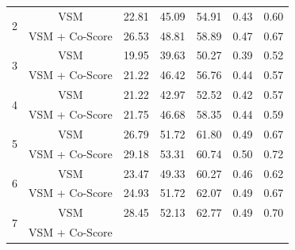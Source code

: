 \documentclass{sig-alternate}
\begin{document}
\begin{table}[]
\begin{tabular}{@{}|c|c|c|c|c|c|c|@{}}
		\multirow{2}{*}{2}                                                                               & VSM & 22.81 & 45.09 & 54.91 & 0.43 & 0.60 \\   &VSM + Co-Score                                                                     & 26.53                                               & 48.81                                              & 58.89                                             &   0.47  &   0.67  \\ \midrule
		\multirow{2}{*}{3}                                                                               & VSM & 19.95 & 39.63 & 50.27 & 0.39 & 0.52 \\   &VSM + Co-Score                                                                       & 21.22                                            & 46.42                                            & 56.76                                             &   0.44  &  0.57   \\ \midrule
	\multirow{2}{*}{4}                                                                               & VSM & 21.22 & 42.97 & 52.52 & 0.42 & 0.57 \\   &VSM + Co-Score                                                                      & 21.75                       & 46.68                       & 58.35                                                &  0.44   &  0.59  \\ \midrule 
			\multirow{2}{*}{5}                                                                               & VSM & 26.79 & 51.72 & 61.80 & 0.49 & 0.67 \\   &VSM + Co-Score                                                                       & 29.18                                                 & 53.31                                                 & 60.74                                                  &  0.50   & 0.72     \\ \midrule
			\multirow{2}{*}{6}                                                                               & VSM & 23.47 & 49.33 & 60.27 & 0.46 & 0.62 \\   &VSM + Co-Score 
		&24.93 &
		51.72 &
		62.07 & 0.49 &
		0.67     \\  \midrule
		\multirow{2}{*}{7}                                                                               & VSM & 28.45 & 52.13 & 62.77 & 0.49 & 0.70 \\   &VSM + Co-Score 
	

\end{tabular}
\end{table}
\end{document}
